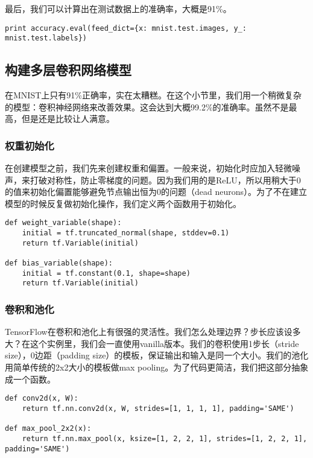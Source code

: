最后，我们可以计算出在测试数据上的准确率，大概是91\%。

\begin{lstlisting}
print accuracy.eval(feed_dict={x: mnist.test.images, y_: mnist.test.labels})
\end{lstlisting}

\subsection{构建多层卷积网络模型}

在MNIST上只有91\%正确率，实在太糟糕。在这个小节里，我们用一个稍微复杂的模型：卷积神经网络来改善效果。这会达到大概99.2\%的准确率。虽然不是最高，但是还是比较让人满意。

\subsubsection{权重初始化}

在创建模型之前，我们先来创建权重和偏置。一般来说，初始化时应加入轻微噪声，来打破对称性，防止零梯度的问题。因为我们用的是ReLU，所以用稍大于0的值来初始化偏置能够避免节点输出恒为0的问题（dead neurons）。为了不在建立模型的时候反复做初始化操作，我们定义两个函数用于初始化。

\begin{lstlisting}
def weight_variable(shape):
    initial = tf.truncated_normal(shape, stddev=0.1)
    return tf.Variable(initial)

def bias_variable(shape):
    initial = tf.constant(0.1, shape=shape)
    return tf.Variable(initial)
\end{lstlisting}

\subsubsection{卷积和池化}

TensorFlow在卷积和池化上有很强的灵活性。我们怎么处理边界？步长应该设多大？在这个实例里，我们会一直使用vanilla版本。我们的卷积使用1步长（stride size），0边距（padding size）的模板，保证输出和输入是同一个大小。我们的池化用简单传统的2x2大小的模板做max pooling。为了代码更简洁，我们把这部分抽象成一个函数。

\begin{lstlisting}
def conv2d(x, W):
    return tf.nn.conv2d(x, W, strides=[1, 1, 1, 1], padding='SAME')

def max_pool_2x2(x):
    return tf.nn.max_pool(x, ksize=[1, 2, 2, 1], strides=[1, 2, 2, 1], padding='SAME')
\end{lstlisting}

